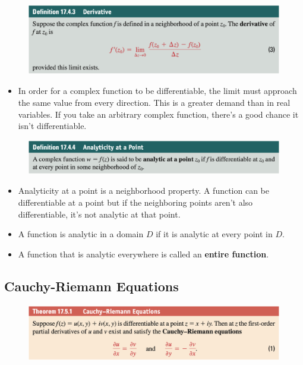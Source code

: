 \documentclass{article}
\begin{document}
\begin{figure}[H]
  \centering
  \includegraphics[width=\textwidth]{derivative}
\end{figure}

\begin{itemize}
  \item In order for a complex function to be differentiable, the limit must approach the same value from every direction. This is a greater demand than in real variables. If you take an arbitrary complex function, there's a good chance it isn't differentiable.
\end{itemize}

\begin{figure}[H]
  \centering
  \includegraphics[width=\textwidth]{analyticity}
\end{figure}

\begin{itemize}
  \item Analyticity at a point is a neighborhood property. A function can be differentiable at a point but if the neighboring points aren't also differentiable, it's not analytic at that point.
  
\item A function is analytic in a domain $D$ if it is analytic at every point in $D$.

  \item A function that is analytic everywhere is called an \textbf{entire function}.
\end{itemize}

\subsection{Cauchy-Riemann Equations}

\begin{figure}[H]
  \centering
  \includegraphics[width=\textwidth]{cauchy-riemann-equations}
\end{figure}
\end{document}

